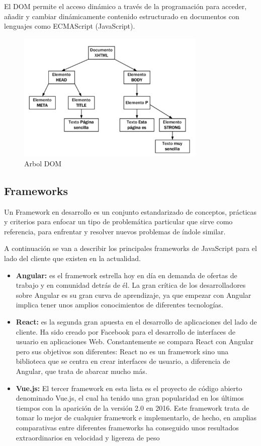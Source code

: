 El DOM permite el acceso dinámico a través de la programación para acceder, añadir y cambiar dinámicamente contenido estructurado en documentos con lenguajes como ECMAScript (JavaScript).
\begin{figure}[!h]
    \centering
    \includegraphics[width=90mm]{img/introduccion/arbol_dom.png}
    \caption{Arbol DOM}
\end{figure}

\subsection{Frameworks}
Un Framework en desarrollo es un conjunto estandarizado de conceptos, prácticas y criterios para enfocar un tipo de problemática particular que sirve como referencia, para enfrentar y resolver nuevos problemas de índole similar.

A continuación se van a describir los principales frameworks de JavaScript para el lado del cliente que existen en la actualidad.
\begin{itemize}
    \item \textbf{Angular: } es el framework estrella hoy en día en demanda de ofertas de trabajo y en comunidad detrás de él.
    La gran crítica de los desarrolladores sobre Angular es su gran curva de aprendizaje, ya que empezar con Angular implica tener unos amplios conocimientos de diferentes tecnologías.
    \item \textbf{React: }es la segunda gran apuesta en el desarrollo de aplicaciones del lado de cliente. Ha sido creado por Facebook para el desarrollo de interfaces de usuario en aplicaciones Web. Constantemente se compara React con Angular pero sus objetivos son diferentes: React no es un framework sino una biblioteca que se centra en crear interfaces de usuario, a diferencia de Angular, que trata de abarcar mucho más.
    \item \textbf{Vue.js: } El tercer framework en esta lista es el proyecto de código abierto denominado Vue.js, el cual ha tenido una gran popularidad en los últimos tiempos con la aparición de la versión 2.0 en 2016. Este framework trata de tomar lo mejor de cualquier framework e implementarlo, de hecho, en amplias comparativas entre diferentes frameworks ha conseguido unos resultados extraordinarios en velocidad y ligereza de peso
\end{itemize}
